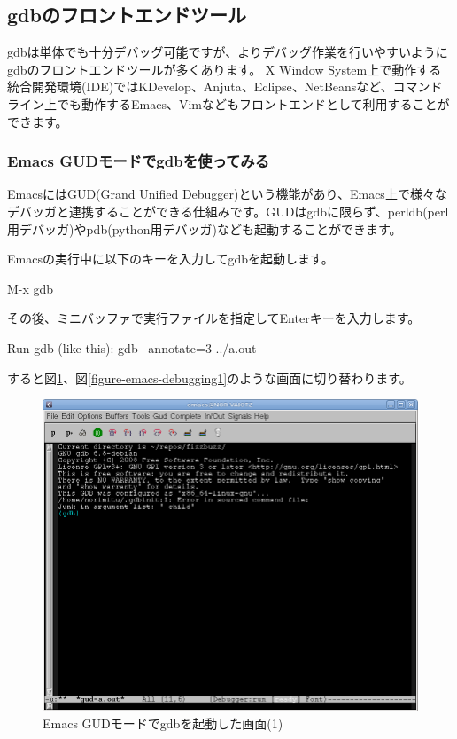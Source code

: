 \documentclass[mingoth,a4paper]{jsarticle}
\begin{document}
\subsection{gdbのフロントエンドツール}
gdbは単体でも十分デバッグ可能ですが、よりデバッグ作業を行いやすいようにgdbのフロントエンドツールが多くあります。
X Window System上で動作する統合開発環境(IDE)ではKDevelop、Anjuta、Eclipse、NetBeansなど、コマンドライン上でも動作するEmacs、Vimなどもフロントエンドとして利用することができます。

\subsubsection{Emacs GUDモードでgdbを使ってみる}
EmacsにはGUD(Grand Unified Debugger)という機能があり、Emacs上で様々なデバッガと連携することができる仕組みです。GUDはgdbに限らず、perldb(perl用デバッガ)やpdb(python用デバッガ)なども起動することができます。

Emacsの実行中に以下のキーを入力してgdbを起動します。

\begin{commandline}
M-x gdb
\end{commandline}

その後、ミニバッファで実行ファイルを指定してEnterキーを入力します。

\begin{commandline}
Run gdb (like this): gdb --annotate=3 ../a.out
\end{commandline}

すると図\ref{figure-emacs-gud1}、図\ref{figure-emacs-debugging1}のような画面に切り替わります。

\begin{figure}[H]
\begin{center}
\includegraphics[scale=0.5]{image200910/gdb-emacs-gud1.png}
\caption{Emacs GUDモードでgdbを起動した画面(1)}\label{figure-emacs-gud1}
\end{center}
\end{figure}
\end{document}
